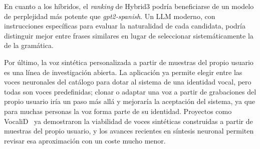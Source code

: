 En cuanto a los híbridos, el \textit{ranking} de Hybrid3 podría beneficiarse de un modelo de perplejidad más potente que \textit{gpt2-spanish}. Un LLM moderno, con instrucciones específicas para evaluar la naturalidad de cada candidata, podría distinguir mejor entre frases similares en lugar de seleccionar sistemáticamente la de la gramática.

Por último, la voz sintética personalizada a partir de muestras del propio usuario es una línea de investigación abierta. La aplicación ya permite elegir entre las voces neuronales del catálogo para dotar al sistema de una identidad vocal, pero todas son voces predefinidas; clonar o adaptar una voz a partir de grabaciones del propio usuario iría un paso más allá y mejoraría la aceptación del sistema, ya que para muchas personas la voz forma parte de su identidad. Proyectos como VocaliD~\cite{mills2014vocaliD} ya demostraron la viabilidad de voces sintéticas construidas a partir de muestras del propio usuario, y los avances recientes en síntesis neuronal permiten revisar esa aproximación con un coste mucho menor.
